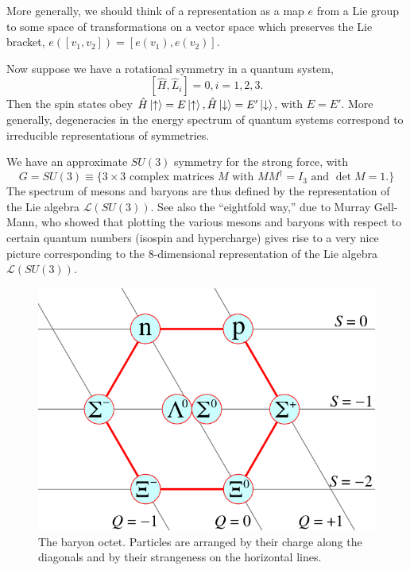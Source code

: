 More generally, we should think of a representation as a map $e$ from a Lie group to some space of transformations on a vector space which preserves the Lie bracket, $e([v_1,v_2])=[e(v_1),e(v_2)]$.

Now suppose we have a rotational symmetry in a quantum system, $$[\hat H, \hat L_i]=0,i=1,2,3.$$ Then the spin states obey $\hat H\left| \uparrow \right>=E\left| \uparrow \right>, \hat H\left| \downarrow \right>= E' \left| \downarrow \right>$, with $E=E'$. More generally, degeneracies in the energy spectrum of quantum systems correspond to irreducible representations of symmetries.

\begin{exm}
We have an approximate $SU(3)$ symmetry for the strong force, with
$$G=SU(3)\equiv \{3\times 3 \text{ complex matrices } M \text{ with } M M^\dagger = I_3 \text{ and } \det M = 1.\}$$
The spectrum of mesons and baryons are thus defined by the representation of the Lie algebra $\mathcal{L}(SU(3))$. See also the ``eightfold way,'' due to Murray Gell-Mann, who showed that plotting the various mesons and baryons with respect to certain quantum numbers (isospin and hypercharge) gives rise to a very nice picture corresponding to the 8-dimensional representation of the Lie algebra $\mathcal{L}(SU(3)).$
\end{exm}

\begin{figure}
\includegraphics[scale=0.4]{2018/10/20181004_baryonoctet}
\caption{The baryon octet. Particles are arranged by their charge along the diagonals and by their strangeness on the horizontal lines.}
\end{figure}